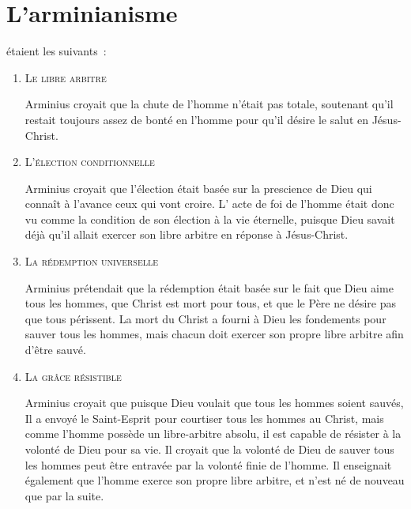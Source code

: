 \section{L'arminianisme}

 étaient les suivants~:\\[.5ex]

\begin{enumerate}
  \item  \textsc{Le libre arbitre}

Arminius croyait que la chute de l'homme
  n'était pas totale,
 soutenant qu'il restait toujours assez de bonté en l'homme
 pour qu'il désire le salut en Jésus-Christ.

  \item  \textsc{L'élection conditionnelle}

Arminius croyait que l'élection était basée sur la prescience
 de Dieu qui connaît à l'avance ceux qui vont croire.
 L' \og acte de foi \fg de l'homme était donc vu comme la \og condition \fg{} 
 de son élection à la vie éternelle, puisque Dieu savait déjà qu'il allait exercer
 son \og libre arbitre \fg{} en réponse à Jésus-Christ.

  \item  \textsc{La rédemption universelle}

Arminius prétendait que la rédemption était basée sur le fait
 que Dieu aime tous les hommes, que Christ est mort pour tous,
 et que le Père ne désire pas que tous périssent.
 La mort du Christ a fourni à Dieu les fondements
 pour sauver tous les hommes, mais chacun doit exercer son propre
 \og libre arbitre \fg{} afin d'être sauvé.

  \item  \textsc{La grâce résistible}

Arminius croyait que puisque Dieu voulait que tous les hommes soient sauvés,
 Il a envoyé le Saint-Esprit pour \og courtiser \fg{}
 tous les hommes au Christ,
 mais comme l'homme possède un \og libre-arbitre \fg{} absolu, il est capable de résister
 à la volonté de Dieu pour sa vie.
 Il croyait que la volonté de Dieu de sauver tous les hommes peut être
 entravée par la volonté finie de l'homme.
 Il enseignait également que l'homme exerce son propre libre arbitre,
 et n'est né de nouveau que par la suite.


\end{enumerate}
